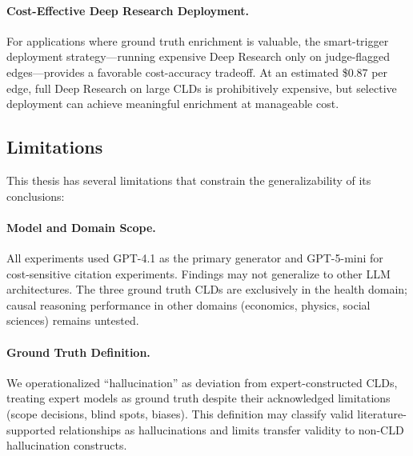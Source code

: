 \paragraph{Cost-Effective Deep Research Deployment.}
For applications where ground truth enrichment is valuable, the smart-trigger deployment strategy---running expensive Deep Research only on judge-flagged edges---provides a favorable cost-accuracy tradeoff. At an estimated \$0.87 per edge, full Deep Research on large CLDs is prohibitively expensive, but selective deployment can achieve meaningful enrichment at manageable cost.

\subsection{Limitations}
\label{sec:conclusion_limitations}

This thesis has several limitations that constrain the generalizability of its conclusions:

\paragraph{Model and Domain Scope.}
All experiments used GPT-4.1 as the primary generator and GPT-5-mini for cost-sensitive citation experiments. Findings may not generalize to other LLM architectures. The three ground truth CLDs are exclusively in the health domain; causal reasoning performance in other domains (economics, physics, social sciences) remains untested.

\paragraph{Ground Truth Definition.}
We operationalized ``hallucination'' as deviation from expert-constructed CLDs, treating expert models as ground truth despite their acknowledged limitations (scope decisions, blind spots, biases). This definition may classify valid literature-supported relationships as hallucinations and limits transfer validity to non-CLD hallucination constructs.

